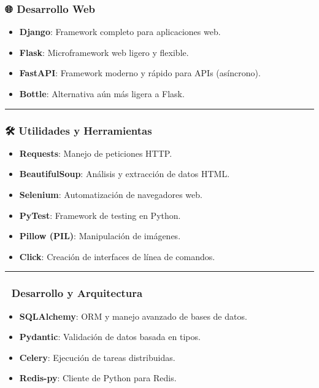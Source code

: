 \documentclass[
]{book}
\providecommand{\tightlist}{%
  \setlength{\itemsep}{0pt}\setlength{\parskip}{0pt}}
\theoremstyle{break}
\theoremstyle{nonumberplain}
\begin{document}
\subsubsection{🌐 Desarrollo Web}\label{desarrollo-web}

\begin{itemize}
\tightlist
\item
  \textbf{Django}: Framework completo para aplicaciones web.
\item
  \textbf{Flask}: Microframework web ligero y flexible.
\item
  \textbf{FastAPI}: Framework moderno y rápido para APIs (asíncrono).
\item
  \textbf{Bottle}: Alternativa aún más ligera a Flask.
\end{itemize}

\begin{center}\rule{0.5\linewidth}{0.5pt}\end{center}

\subsubsection{🛠️ Utilidades y Herramientas}\label{utilidades-y-herramientas}

\begin{itemize}
\tightlist
\item
  \textbf{Requests}: Manejo de peticiones HTTP.
\item
  \textbf{BeautifulSoup}: Análisis y extracción de datos HTML.
\item
  \textbf{Selenium}: Automatización de navegadores web.
\item
  \textbf{PyTest}: Framework de testing en Python.
\item
  \textbf{Pillow (PIL)}: Manipulación de imágenes.
\item
  \textbf{Click}: Creación de interfaces de línea de comandos.
\end{itemize}

\begin{center}\rule{0.5\linewidth}{0.5pt}\end{center}

\subsubsection{🧱 Desarrollo y Arquitectura}\label{desarrollo-y-arquitectura}

\begin{itemize}
\tightlist
\item
  \textbf{SQLAlchemy}: ORM y manejo avanzado de bases de datos.
\item
  \textbf{Pydantic}: Validación de datos basada en tipos.
\item
  \textbf{Celery}: Ejecución de tareas distribuidas.
\item
  \textbf{Redis-py}: Cliente de Python para Redis.
\end{itemize}
\end{document}
